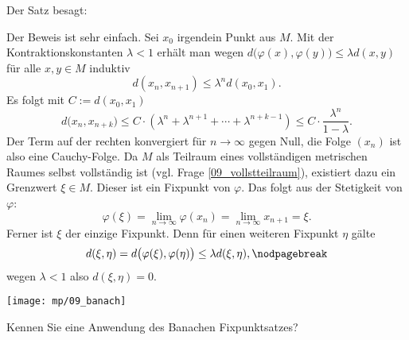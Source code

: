 \begin{antwort}
  Der Satz besagt:

  \medskip\noindent

  \medskip
  \noindent
  Der Beweis ist sehr einfach. Sei $x_0$ irgendein Punkt aus $M$.  
  Mit der Kontraktionskonstanten $\lambda<1$ erhält man wegen 
  $d\big( \varphi(x), \varphi(y) \big) \le \lambda d( x,y )$ für alle $x,y\in M$ 
  induktiv
  \[
  d (x_n,x_{n+1}) \le \lambda^n d ( x_0, x_1 ).
  \]
  Es folgt mit $C:=d(x_0,x_1)$
  \[
  d\big( x_n, x_{n+k} ) \le 
  C\cdot (\lambda^n+\lambda^{n+1} +\cdots + \lambda^{n+k-1})
  \le C\cdot\frac{\lambda^n}{1-\lambda}.
  \]
  Der Term auf der rechten konvergiert für $n\to\infty$ gegen Null, die Folge $(x_n)$ ist also eine Cauchy-Folge. 
  Da $M$ als Teilraum eines vollständigen metrischen Raumes 
  selbst vollständig ist (vgl. Frage \ref{09_vollstteilraum}), 
  existiert dazu ein Grenzwert 
  $\xi\in M$. Dieser ist 
  ein Fixpunkt von $\varphi$. Das folgt aus der Stetigkeit von $\varphi$:
  \[
  \varphi( \xi) = \lim_{n\to\infty} \varphi( x_n )= \lim_{n\to\infty} 
  x_{n+1} = \xi.
  \]
  Ferner ist $\xi$ der einzige Fixpunkt. Denn für einen 
  weiteren Fixpunkt $\eta$ gälte
  \[
  d( \xi, \eta ) = d \big( \varphi(\xi), \varphi(\eta) \big) \le 
  \lambda d( \xi,\eta ),\nodpagebreak
  \]
  wegen $\lambda<  1$ also $d(\xi,\eta)=0$. \AntEnd 

  \begin{center}
    \texttt{[image: mp/09\_banach]}
    \label{fig:09_banach}
  \end{center}
\end{antwort} 

\begin{frage}
  Kennen Sie eine Anwendung des Banach\sch en Fixpunktsatzes?
\end{frage}

